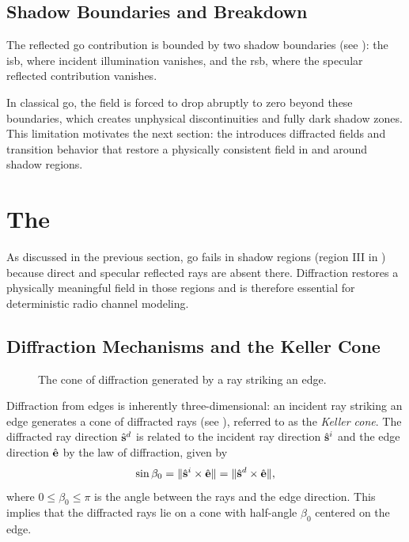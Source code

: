 \subsection{Shadow Boundaries and  Breakdown}

The reflected \gls{go} contribution is bounded by two shadow boundaries (see ): the \gls{isb}, where incident illumination vanishes, and the \gls{rsb}, where the specular reflected contribution vanishes.

\begin{marginfigure}
  \centering
  \caption{Regions and their boundaries in .}
\end{marginfigure}

In classical \gls{go}, the field is forced to drop abruptly to zero beyond these boundaries, which creates unphysical discontinuities and fully dark shadow zones. This limitation motivates the next section: the  introduces diffracted fields and transition behavior that restore a physically consistent field in and around \glspl{shadow region}.

\section{The \texorpdfstring{}{Uniform Theory of Diffraction}}

As discussed in the previous section, \gls{go} fails in \glspl{shadow region} (region III in ) because direct and specular reflected rays are absent there. Diffraction restores a physically meaningful field in those regions and is therefore essential for deterministic radio channel modeling.

\subsection{Diffraction Mechanisms and the Keller Cone}

\begin{figure}
  \centering
  \caption{The cone of diffraction generated by a ray striking an edge.}
\end{figure}

Diffraction from edges is inherently three-dimensional: an incident ray striking an edge generates a cone of diffracted rays (see ), referred to as the \emph{Keller cone}. The diffracted ray direction $\hat{\mathbf{s}}^d$ is related to the incident ray direction $\hat{\mathbf{s}}^i$ and the edge direction $\hat{\mathbf{e}}$ by the law of diffraction, given by
\begin{equation}
  \sin\beta_0 = \|\hat{\mathbf{s}}^i \times \hat{\mathbf{e}}\| = \|\hat{\mathbf{s}}^d \times \hat{\mathbf{e}}\|,\label{eq:law-diffraction}
\end{equation}
where $0 \leq \beta_0 \leq \pi$ is the angle between the rays and the edge direction. This implies that the diffracted rays lie on a cone with half-angle $\beta_0$ centered on the edge.

